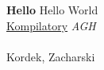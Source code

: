 \documentclass[12pt]{article}
\begin{document}
\textbf{Hello}
Hello World
\\
\underline{Kompilatory}
\textit{AGH}
\\
\\
Kordek, Zacharski
\end{document}
